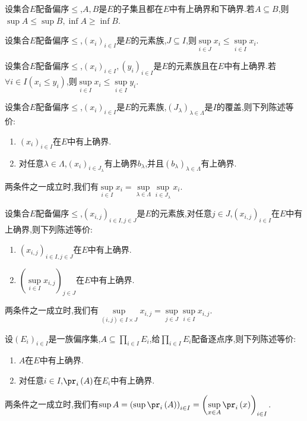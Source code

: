 \begin{proposition}{}{}
	设集合$E$配备偏序$\leq$,$A,B$是$E$的子集且都在$E$中有上确界和下确界.若$A\subseteq B$,则$\sup A\leq\sup B,\inf A\geq \inf B$.
\end{proposition}

\begin{corollary}{}{}
	设集合$E$配备偏序$\leq$,$\left(x_{i}\right)_{i\in I}$是$E$的元素族,$J\subseteq I$,则$\sup\limits_{i\in J}x_{i}\leq\sup\limits_{i\in I}x_{i}$.
\end{corollary}

\begin{proposition}{}{}
	设集合$E$配备偏序$\leq$,$\left(x_{i}\right)_{i\in I},\left(y_{i}\right)_{i\in I}$是$E$的元素族且在$E$中有上确界.若$\forall i\in I\left(x_{i}\leq y_{i}\right)$,则$\sup\limits_{i\in I}x_{i}\leq\sup\limits_{i\in I}y_{i}$.
\end{proposition}

\begin{proposition}{}{}
	设集合$E$配备偏序$\leq$,$\left(x_{i}\right)_{i\in I}$是$E$的元素族,$\left(J_{\lambda}\right)_{\lambda\in\Lambda}$是$I$的覆盖,则下列陈述等价:
	\begin{enumerate}
		\item $\left(x_{i}\right)_{i\in I}$在$E$中有上确界.
		\item 对任意$\lambda\in\Lambda$,$\left(x_{i}\right)_{i\in J_{\lambda}}$有上确界$b_{\lambda}$,并且$\left(b_{\lambda}\right)_{\lambda\in\Lambda}$有上确界.
	\end{enumerate}
	两条件之一成立时,我们有$\sup\limits_{i\in I}x_{i}=\sup\limits_{\lambda\in\Lambda}\sup\limits_{i\in J_{\lambda}}x_{i}$.
\end{proposition}

\begin{corollary}{}{}
	设集合$E$配备偏序$\leq$,$\left(x_{i,j}\right)_{i\in I,j\in J}$是$E$的元素族,对任意$j\in J$,$\left(x_{i,j}\right)_{i\in I}$在$E$中有上确界,则下列陈述等价:
	\begin{enumerate}
		\item $\left(x_{i,j}\right)_{i\in I,j\in J}$在$E$中有上确界.
		\item $\left(\sup\limits_{i\in I}x_{i,j}\right)_{j\in J}$在$E$中有上确界.
	\end{enumerate}
	两条件之一成立时,我们有$\sup\limits_{\left(i,j\right)\in I\times J}x_{i,j}=\sup\limits_{j\in J}\sup\limits_{i\in I}x_{i,j}$.
\end{corollary}

\begin{proposition}{}{}
	设$\left(E_{i}\right)_{i\in I}$是一族偏序集,$A\subseteq\prod\limits_{i\in I}E_{i}$,给$\prod\limits_{i\in I}E_{i}$配备逐点序,则下列陈述等价:
	\begin{enumerate}
		\item $A$在$E$中有上确界.
		\item 对任意$i\in I$,$\pr_{i}\left(A\right)$在$E_{i}$中有上确界.
	\end{enumerate}
	两条件之一成立时,我们有$\sup A=\left(\sup\pr_{i}\left(A\right)\right)_{i\in I}=\left(\sup\limits_{x\in A}\pr_{i}\left(x\right)\right)_{i\in I}$.
\end{proposition}

